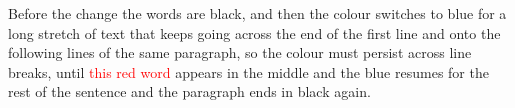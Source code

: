 \documentclass[12pt]{article}
\begin{document}
Before the change the words are black, and then {\color{blue} the colour
switches to blue for a long stretch of text that keeps going across the end of
the first line and onto the following lines of the same paragraph, so the
colour must persist across line breaks, until \textcolor{red}{this red word}
appears in the middle and the blue resumes for the rest of the sentence} and
the paragraph ends in black again.
\end{document}
